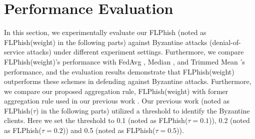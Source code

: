 \documentclass[journal]{IEEEtran}
\begin{document}
\section{Performance Evaluation}
In this section, we experimentally evaluate our FLPhish (noted as FLPhish(weight) in the following parts) against Byzantine attacks (denial-of-service attacks) under different experiment settings. Furthermore, we compare FLPhish(weight)'s performance with FedAvg \cite{ref_01_GoogleFL}, Median \cite{ref_13_defense}, and Trimmed Mean \cite{ref_13_defense}'s performance, and the evaluation results demonstrate that FLPhish(weight) outperforms these schemes in defending against Byzantine attacks. Furthermore, we compare our proposed aggregation rule, FLPhish(weight) with former aggregation rule used in our previous work \cite{li2021flphish}. Our previous work (noted as FLPhish($\tau$) in the following parts) utilized a threshold to identify the Byzantine clients. Here we set the threshold to 0.1 (noted as FLPhish($\tau=0.1$)), 0.2 (noted as FLPhish($\tau=0.2$)) and 0.5 (noted as FLPhish($\tau=0.5$)).

\begin{table}[t]
  \renewcommand\arraystretch{1.5}
  \centering
  \caption{Evaluated Scheme}
  \end{table}
\end{document}
